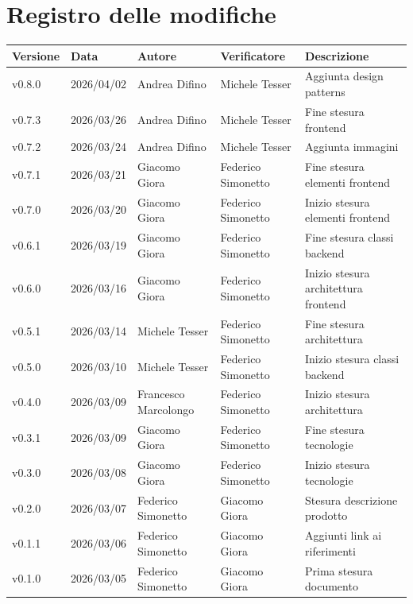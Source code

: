 \documentclass[a4paper,12pt]{article}
\begin{document}
\section*{Registro delle modifiche}
\begin{center}
    \begin{tabularx}{\textwidth}{|l|l|l|X|X|}
        \hline
        \rowcolor{lightgray}
        \textbf{Versione}  & \textbf{Data}       & \textbf{Autore}      & \textbf{Verificatore} & \textbf{Descrizione} \\
        \hline
        v0.8.0 & 2026/04/02 & Andrea Difino & Michele Tesser & Aggiunta design patterns \\
        \hline
        v0.7.3 & 2026/03/26 & Andrea Difino & Michele Tesser & Fine stesura frontend\\
        \hline
        v0.7.2 & 2026/03/24 & Andrea Difino & Michele Tesser & Aggiunta immagini\\
        \hline
        v0.7.1 & 2026/03/21 & Giacomo Giora & Federico Simonetto & Fine stesura elementi frontend\\
        \hline
        v0.7.0 & 2026/03/20 & Giacomo Giora & Federico Simonetto & Inizio stesura elementi frontend\\
        \hline
        v0.6.1 & 2026/03/19 & Giacomo Giora & Federico Simonetto & Fine stesura classi backend\\
        \hline
        v0.6.0 & 2026/03/16 & Giacomo Giora & Federico Simonetto & Inizio stesura architettura frontend\\
        \hline
        v0.5.1 & 2026/03/14 & Michele Tesser & Federico Simonetto & Fine stesura architettura\\
        \hline
        v0.5.0 & 2026/03/10 & Michele Tesser & Federico Simonetto & Inizio stesura classi backend \\
        \hline
        v0.4.0 & 2026/03/09 & Francesco Marcolongo & Federico Simonetto & Inizio stesura architettura \\
        \hline
        v0.3.1 & 2026/03/09 & Giacomo Giora & Federico Simonetto & Fine stesura tecnologie \\
        \hline
        v0.3.0 & 2026/03/08 & Giacomo Giora & Federico Simonetto & Inizio stesura tecnologie \\
        \hline
        v0.2.0 & 2026/03/07 & Federico Simonetto & Giacomo Giora & Stesura descrizione prodotto \\
        \hline
        v0.1.1 & 2026/03/06 & Federico Simonetto & Giacomo Giora & Aggiunti link ai riferimenti \\
        \hline
        v0.1.0 & 2026/03/05 & Federico Simonetto & Giacomo Giora & Prima stesura documento \\
        \hline
    \end{tabularx}
\end{center}
\end{document}
